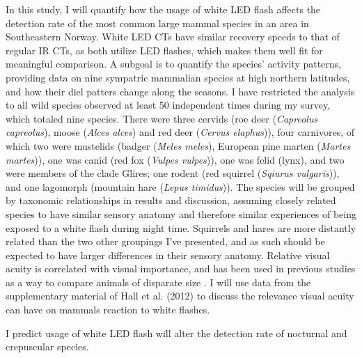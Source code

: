 In this study, I will quantify how the usage of white LED flash affects the detection rate of the most common large mammal species in an area in Southeastern Norway.
White LED CTs have similar recovery speeds to that of regular IR CTs, as both utilize LED flashes, which makes them well fit for meaningful comparison.
A subgoal is to quantify the species' activity patterns, providing data on nine sympatric mammalian species at high northern latitudes, and how their diel patters change along the seasons. 
I have restricted the analysis to all wild species observed at least 50 independent times during my survey, which totaled nine species.
There were three cervids (roe deer (\textit{Capreolus capreolus}), moose (\textit{Alces alces}) and red deer (\textit{Cervus elaphus})),
four carnivores, of which two were mustelids (badger (\textit{Meles meles}), European pine marten (\textit{Martes martes})), one was canid (red fox (\textit{Vulpes vulpes})), one was felid (lynx), 
and two were members of the clade Glires; one rodent (red squirrel (\textit{Sqiurus vulgaris})), and one lagomorph (mountain hare (\textit{Lepus timidus})).
The species will be grouped by taxonomic relationships in results and discussion, assuming closely related species to have similar sensory anatomy and therefore similar experiences of being exposed to a white flash during night time. 
Squirrels and hares are more distantly related than the two other groupings I've presented, and as such should be expected to have larger differences in their sensory anatomy. 
Relative visual acuity is correlated with visual importance, and has been used in previous studies as a way to compare animals of disparate size \autocite{Hall2012}. I will use data from the supplementary material of Hall et al. (2012) to discuss the relevance visual acuity can have on mammals reaction to white flashes.

I predict usage of white LED flash will alter the detection rate of nocturnal and crepuscular species.





